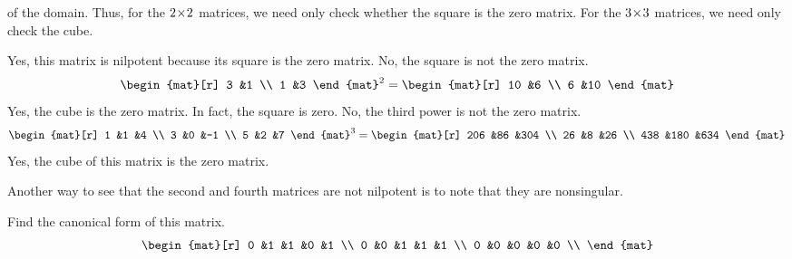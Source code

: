 \begin{exercises}
\begin{answer}
      of the domain.
      Thus, for the $2 \! \times \! 2$ matrices, 
      we need only check whether the square is the zero matrix.
      For the $3 \! \times \! 3$ matrices, we need only check the cube.
      \begin{exparts}
        \partsitem Yes, this matrix is nilpotent because
          its square is the zero matrix.
        \partsitem No, the square is not the zero matrix.
          \begin{equation*}
            \begin{mat}[r]
               3  &1  \\
               1  &3
            \end{mat}^2
            =\begin{mat}[r]
               10  &6  \\
               6   &10
            \end{mat}
          \end{equation*}
        \partsitem Yes, the cube is the zero matrix.
          In fact, the square is zero.
        \partsitem No, the third power is not the zero matrix.
          \begin{equation*}
            \begin{mat}[r]
              1  &1  &4  \\
              3  &0  &-1 \\
              5  &2  &7
            \end{mat}^3
            =\begin{mat}[r]
              206  &86  &304  \\
               26  &8   &26   \\
              438  &180 &634
            \end{mat}
          \end{equation*}
        \partsitem Yes, the cube of this matrix is the zero matrix.
      \end{exparts}
      Another way to see that the second and fourth matrices are not nilpotent
      is to note that they are nonsingular.
    \end{answer}
  \recommended \item 
    Find the canonical form of this matrix.
    \begin{equation*}
      \begin{mat}[r]
        0  &1  &1  &0  &1  \\
        0  &0  &1  &1  &1  \\
        0  &0  &0  &0  &0  \\

\end{mat}
\end{equation*}
\end{exercises}
